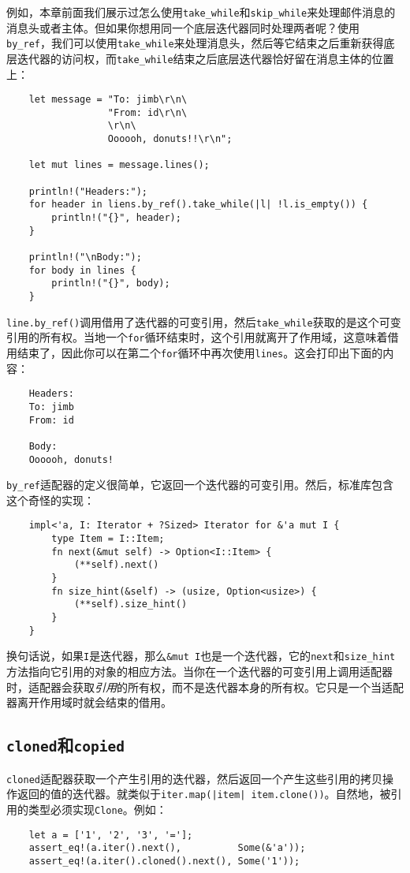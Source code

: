 例如，本章前面我们展示过怎么使用\texttt{take\_while}和\texttt{skip\_while}来处理邮件消息的消息头或者主体。但如果你想用同一个底层迭代器同时处理两者呢？使用\texttt{by\_ref}，我们可以使用\texttt{take\_while}来处理消息头，然后等它结束之后重新获得底层迭代器的访问权，而\texttt{take\_while}结束之后底层迭代器恰好留在消息主体的位置上：
\begin{verbatim}
    let message = "To: jimb\r\n\
                  "From: id\r\n\
                  \r\n\
                  Oooooh, donuts!!\r\n";

    let mut lines = message.lines();

    println!("Headers:");
    for header in liens.by_ref().take_while(|l| !l.is_empty()) {
        println!("{}", header);
    }

    println!("\nBody:");
    for body in lines {
        println!("{}", body);
    }
\end{verbatim}
\texttt{line.by\_ref()}调用借用了迭代器的可变引用，然后\texttt{take\_while}获取的是这个可变引用的所有权。当地一个\texttt{for}循环结束时，这个引用就离开了作用域，这意味着借用结束了，因此你可以在第二个\texttt{for}循环中再次使用\texttt{lines}。这会打印出下面的内容：
\begin{verbatim}
    Headers:
    To: jimb
    From: id

    Body:
    Oooooh, donuts!
\end{verbatim}

\texttt{by\_ref}适配器的定义很简单，它返回一个迭代器的可变引用。然后，标准库包含这个奇怪的实现：
\begin{verbatim}
    impl<'a, I: Iterator + ?Sized> Iterator for &'a mut I {
        type Item = I::Item;
        fn next(&mut self) -> Option<I::Item> {
            (**self).next()
        }
        fn size_hint(&self) -> (usize, Option<usize>) {
            (**self).size_hint()
        }
    }
\end{verbatim}

换句话说，如果\texttt{I}是迭代器，那么\texttt{\&mut I}也是一个迭代器，它的\texttt{next}和\texttt{size\_hint}方法指向它引用的对象的相应方法。当你在一个迭代器的可变引用上调用适配器时，适配器会获取\emph{引用}的所有权，而不是迭代器本身的所有权。它只是一个当适配器离开作用域时就会结束的借用。

\subsection{\texttt{cloned}和\texttt{copied}}
\texttt{cloned}适配器获取一个产生引用的迭代器，然后返回一个产生这些引用的拷贝操作返回的值的迭代器。就类似于\texttt{iter.map(|item| item.clone())}。自然地，被引用的类型必须实现\texttt{Clone}。例如：
\begin{verbatim}
    let a = ['1', '2', '3', '='];
    assert_eq!(a.iter().next(),          Some(&'a'));
    assert_eq!(a.iter().cloned().next(), Some('1'));
\end{verbatim}

